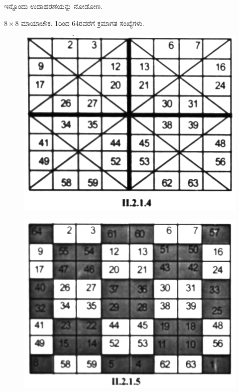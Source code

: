 ಇನ್ನೊಂದು ಉದಾಹರಣೆಯನ್ನು ನೋಡೋಣ.

$8 \times 8$ ಮಾಯಾಚೌಕ. 1ರಿಂದ 64ರವರೆಗೆ ಕ್ರಮಾಗತ ಸಂಖ್ಯೆಗಳು.
\begin{figure}[h]
\includegraphics{src/figures/chap3/fig3.17.jpg}
\end{figure}
\begin{figure}[h]
\includegraphics{src/figures/chap3/fig3.18.jpg}
\end{figure}

